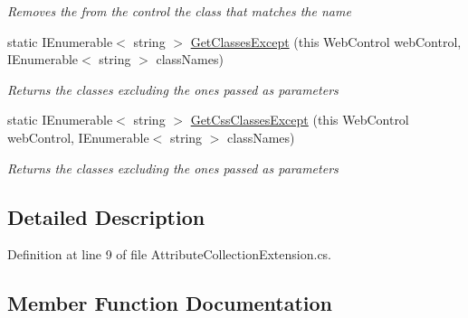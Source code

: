 \begin{DoxyCompactItemize}
\begin{DoxyCompactList}\small\item\em Removes the from the control the class that matches the name \end{DoxyCompactList}\item 
static I\+Enumerable$<$ string $>$ \mbox{\hyperlink{classWebApplication_1_1Framework_1_1Extensions_1_1AttributeCollectionExtension_affd7f518f210175330b6665f31a8ae5d}{Get\+Classes\+Except}} (this Web\+Control web\+Control, I\+Enumerable$<$ string $>$ class\+Names)
\begin{DoxyCompactList}\small\item\em Returns the classes excluding the ones passed as parameters \end{DoxyCompactList}\item 
static I\+Enumerable$<$ string $>$ \mbox{\hyperlink{classWebApplication_1_1Framework_1_1Extensions_1_1AttributeCollectionExtension_abe19cee51d3f3fc88a1d96986d48022e}{Get\+Css\+Classes\+Except}} (this Web\+Control web\+Control, I\+Enumerable$<$ string $>$ class\+Names)
\begin{DoxyCompactList}\small\item\em Returns the classes excluding the ones passed as parameters \end{DoxyCompactList}\end{DoxyCompactItemize}


\subsection{Detailed Description}


Definition at line 9 of file Attribute\+Collection\+Extension.\+cs.



\subsection{Member Function Documentation}
\mbox{\label{classWebApplication_1_1Framework_1_1Extensions_1_1AttributeCollectionExtension_abc9cbb51515a7c876753483c80476567}} 
